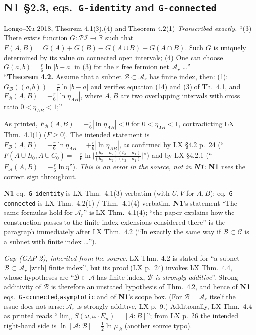 \documentclass[11pt]{article}
\newcommand{\Ar}{\mathcal A_r}
\newcommand{\NI}{\textbf{N1}}
\newcommand{\loc}[1]{{\small\texttt{#1}}}
\newcommand{\1}{\mathbf 1}
\begin{document}
\subsection{N1 \S2.3, eqs.\ \loc{G-identity} and \loc{G-connected}}
\begin{citedbox}{Longo--Xu 2018, Theorem 4.1(3),(4) and Theorem 4.2(1)}
\emph{Transcribed exactly.} ``(3) There exists function $G:\mathcal{PI}\to\mathbb R$ such that
$F(A,B)=G(A)+G(B)-G(A\cup B)-G(A\cap B)$. Such $G$ is uniquely determined by its value on connected open intervals;
(4) One can choose $G(a,b)=\frac r6\ln|b-a|$ in (3) for the $r$ free fermion net $\Ar$ \dots''\\[2pt]
``\textbf{Theorem 4.2.} Assume that a subnet $\mathcal B\subset\Ar$ has finite index, then:
(1): $G_{\mathcal B}((a,b))=\frac r6\ln|b-a|$ and verifies equation (14) and (3) of Th.~4.1, and
$F_{\mathcal B}(A,B)=-\frac r6|\ln\eta_{AB}|$, where $A,B$ are two overlapping intervals with cross ratio $0<\eta_{AB}<1$;''\\[2pt]
\end{citedbox}
\begin{issue}\label{iss:lx421}
As printed, $F_{\mathcal B}(A,B)=-\frac r6|\ln\eta_{AB}|<0$ for $0<\eta_{AB}<1$, contradicting
LX Thm.~4.1(1) ($F\ge0$). The intended statement is $F_{\mathcal B}(A,B)=-\frac r6\ln\eta_{AB}=+\frac r6|\ln\eta_{AB}|$,
as confirmed by LX \S4.2 p.~24 (``$F(A\bar\cup B_0,A\bar\cup C_0)=-\frac r6\ln\bigl|\frac{(b_2-a_2)(b_3-a_1)}{(b_3-a_2)(b_2-a_1)}\bigr|$'')
and by LX \S4.2.1 (``$F_{\mathcal A}(A,B)=-\frac r6\ln\eta$''). \emph{This is an error in the source, not in \NI:}
\NI{} uses the correct sign throughout.
\end{issue}
\begin{verdictok}
\NI{} eq.~\loc{G-identity} is LX Thm.~4.1(3) verbatim (with $U,V$ for $A,B$); eq.~\loc{G-connected}
is LX Thm.~4.2(1) / Thm.~4.1(4) verbatim. \NI's statement ``The same formulas hold for $\Ar$'' is
LX Thm.~4.1(4); ``the paper explains how the construction passes to the finite-index extensions
considered there'' is the paragraph immediately after LX Thm.~4.2 (``In exactly the same way if
$\mathcal B\subset\mathcal C$ is a subnet with finite index \dots'').
\end{verdictok}
\begin{verdictgap}
\emph{Gap (GAP-2), inherited from the source.} LX Thm.~4.2 is stated for ``a subnet $\mathcal B\subset\Ar$
[with] finite index'', but its proof (LX p.~24) invokes LX Thm.~4.4, whose hypotheses are
``$\mathcal B\subset\mathcal A$ has finite index, \emph{$\mathcal B$ is strongly additive}''. Strong
additivity of $\mathcal B$ is therefore an unstated hypothesis of Thm.~4.2, and hence of \NI{}
eqs.~\loc{G-connected},\loc{asymptotic} and of \NI's scope box. (For $\mathcal B=\Ar$ itself the issue
does not arise: $\Ar$ is strongly additive, LX p.~9.) Additionally, LX Thm.~4.4 as printed reads
``$\lim_n S(\omega,\omega\cdot E_n)=[A:B]$''; from LX p.~26 the intended right-hand side is
$\ln[\mathcal A:\mathcal B]=\frac12\ln\mu_{\mathcal B}$ (another source typo).
\end{verdictgap}
\end{document}
